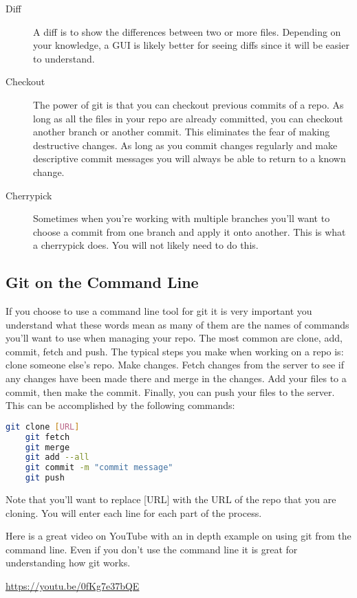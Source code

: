 \begin{description}
	\item[Diff] A diff is to show the differences between two or more files. Depending on your knowledge, a GUI is likely better for seeing diffs since it will be easier to understand.
	\item[Checkout] The power of git is that you can checkout previous commits of a repo. As long as all the files in your repo are already committed, you can checkout another branch or another commit. This eliminates the fear of making destructive changes. As long as you commit changes regularly and make descriptive commit messages you will always be able to return to a known change.
	\item[Cherrypick] Sometimes when you're working with multiple branches you'll want to choose a commit from one branch and apply it onto another. This is what a cherrypick does. You will not likely need to do this.
\end{description}

\subsection{Git on the Command Line}

If you choose to use a command line tool for git it is very important you understand what these words mean as many of them are the names of commands you'll want to use when managing your repo. The most common are clone, add, commit, fetch and push. The typical steps you make when working on a repo is: clone someone else's repo. Make changes. Fetch changes from the server to see if any changes have been made there and merge in the changes. Add your files to a commit, then make the commit. Finally, you can push your files to the server. This can be accomplished by the following commands:

\begin{lstlisting}[language=bash]
	git clone [URL]
	git fetch
	git merge
	git add --all
	git commit -m "commit message"
	git push
\end{lstlisting}

Note that you'll want to replace [URL] with the URL of the repo that you are cloning. You will enter each line for each part of the process.

Here is a great video on YouTube with an in depth example on using git from the command line. Even if you don't use the command line it is great for understanding how git works.
\begin{center}
	\url{https://youtu.be/0fKg7e37bQE}
\end{center}